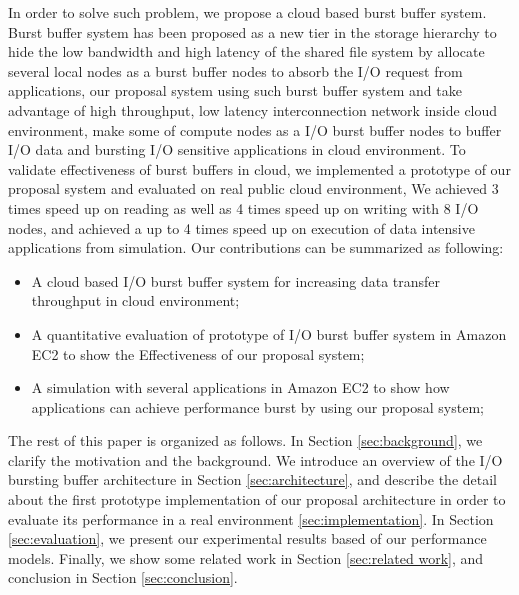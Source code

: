 In order to solve such problem, we propose a cloud based burst buffer system. Burst buffer system
has been proposed as a new tier in the storage hierarchy to hide the low bandwidth and high latency
of the shared file system by allocate several local nodes as a burst buffer nodes to absorb the I/O
request from applications, our proposal system using such burst buffer system and take advantage of
high throughput, low latency interconnection network inside cloud environment, make some of compute
nodes as a I/O burst buffer nodes to buffer I/O data and bursting I/O sensitive applications in cloud environment.
To validate effectiveness of burst buffers in cloud, we implemented a prototype of our
proposal system and evaluated on real public cloud environment,
We achieved 3 times speed up on reading as well as 4 times speed up on writing with 8 I/O nodes, and
achieved a up to 4 times speed up on execution of data intensive applications from simulation.
Our contributions can be summarized as following:
\begin{itemize}
	\item A cloud based I/O burst buffer system for increasing data transfer throughput in cloud environment;
	\item A quantitative evaluation of prototype of I/O burst buffer system in Amazon EC2 to show the
	Effectiveness of our proposal system;
    \item A simulation with several applications in Amazon EC2 to show how applications can achieve
    performance burst by using our proposal system;
\end{itemize}

The rest of this paper is organized as follows. 
In Section \ref{sec:background}, we clarify the motivation and the background.
We introduce an overview of the I/O bursting buffer architecture in Section \ref{sec:architecture}, 
and describe the detail about the first prototype implementation of our proposal architecture in
order to evaluate its performance in a real environment \ref{sec:implementation}.
In Section \ref{sec:evaluation}, we present our experimental results based of our performance models.
Finally, we show some related work in Section \ref{sec:related work}, and conclusion in Section \ref{sec:conclusion}.
